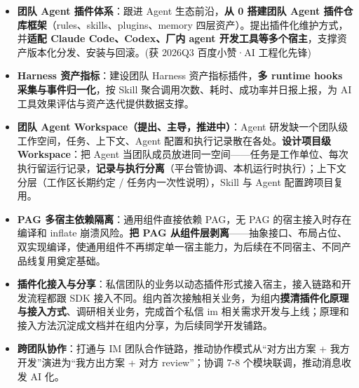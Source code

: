 \documentclass{resume}
\begin{document}
\begin{onehalfspacing}
  \begin{itemize}
    \item \textbf{团队 Agent 插件体系}：跟进 Agent 生态前沿，\textbf{从 0 搭建团队 Agent 插件仓库框架}（rules、skills、plugins、memory 四层资产）。提出插件化维护方式，并\textbf{适配 Claude Code、Codex、厂内 agent 开发工具等多个宿主}，支撑资产版本化分发、安装与回滚。(获 2026Q3 百度小赞·AI 工程化先锋)
    \item \textbf{Harness 资产指标}：建设团队 Harness 资产指标插件，\textbf{多 runtime hooks 采集与事件归一化}，按 Skill 聚合调用次数、耗时、成功率并日报上报，为 AI 工具效果评估与资产迭代提供数据支撑。
    \item \textbf{团队 Agent Workspace（提出、主导，推进中）}：Agent 研发缺一个团队级工作空间，任务、上下文、Agent 配置和执行记录散在各处。\textbf{设计项目级 Workspace}：把 Agent 当团队成员放进同一空间——任务是工作单位、每次执行留运行记录，\textbf{记录与执行分离}（平台管协调、本机运行时执行）；上下文分层（工作区长期约定 / 任务内一次性说明），Skill 与 Agent 配置跨项目复用。
  \end{itemize}
\end{onehalfspacing}

\begin{onehalfspacing}
  \begin{itemize}
    \item \textbf{PAG 多宿主依赖隔离}：通用组件直接依赖 PAG，无 PAG 的宿主接入时存在编译和 inflate 崩溃风险。\textbf{把 PAG 从组件层剥离}——抽象接口、布局占位、双实现编译，使通用组件不再绑定单一宿主能力，为后续在不同宿主、不同产品线复用奠定基础。
  \end{itemize}
\end{onehalfspacing}

\begin{onehalfspacing}
  \begin{itemize}
    \item \textbf{插件化接入与分享}：私信团队的业务以动态插件形式接入宿主，接入链路和开发流程都跟 SDK 接入不同。组内首次接触相关业务，为组内\textbf{摸清插件化原理与接入方式}、调研相关业务，完成首个私信 im 相关需求开发与上线；原理和接入方法沉淀成文档并在组内分享，为后续同学开发铺路。
    \item \textbf{跨团队协作}：打通与 IM 团队合作链路，推动协作模式从“对方出方案 + 我方开发”演进为“我方出方案 + 对方 review”；协调 7-8 个模块联调，推动消息收发 AI 化。
  \end{itemize}
\end{onehalfspacing}
\end{document}
